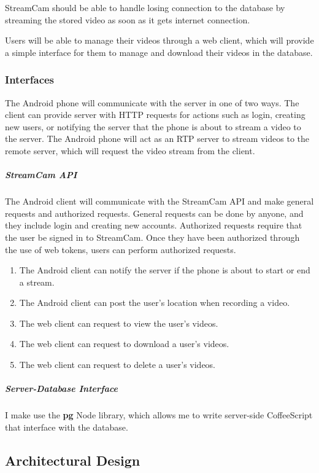 \documentclass[11pt,a4paper,titlepage]{article}
\begin{document}
StreamCam should be able to handle losing connection to the database by streaming the stored video as soon as it gets internet connection. 

Users will be able to manage their videos through a web client, which will provide a simple interface for them to manage and download their videos in the database. 

\subsubsection{Interfaces}

The Android phone will communicate with the server in one of two ways. The client can provide server with HTTP requests for actions such as login, creating new users, or notifying the server that the phone is about to stream a video to the server. The Android phone will act as an RTP server to stream videos to the  remote server, which will request the video stream from the client. 

\subparagraph{StreamCam API\\}

The Android client will communicate with the StreamCam API and make general requests and authorized requests. General requests can be done by anyone, and they include login and creating new accounts. Authorized requests require that the user be signed in to StreamCam. Once they have been authorized through the use of web tokens, users can perform authorized requests. 
\begin{enumerate}
  \item The Android client can notify the server if the phone is about to start or end a stream.
  \item The Android client can post the user's location when recording a video. 
  \item The web client can request to view the user's videos.
  \item The web client can request to download a user's videos.
  \item The web client can request to delete a user's videos.
\end{enumerate}

\subparagraph{Server-Database Interface\\}

I make use the \textbf{pg} Node library, which allows me to write server-side CoffeeScript that interface with the database. 

\subsection{Architectural Design}
\end{document}
